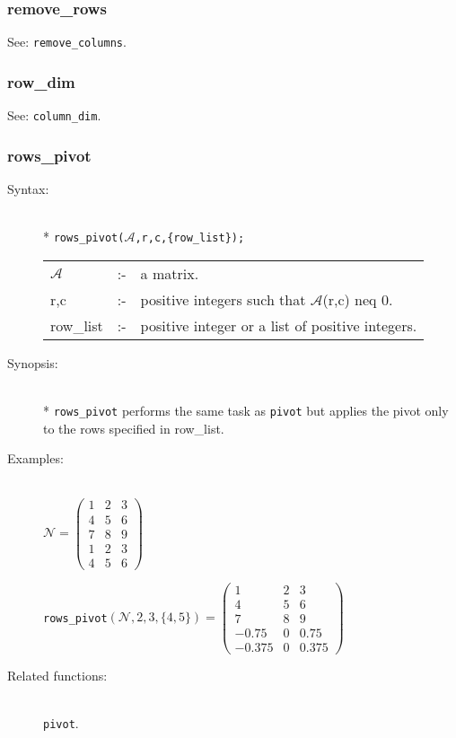 \subsubsection{remove\_rows}
\label{linalg:remove_rows}
See: \texttt{remove\_columns}.


\subsubsection{row\_dim}
\label{linalg:row_dim}

See: \texttt{column\_dim}.


\subsubsection{rows\_pivot}
\label{linalg:rows_pivot}

\begin{description}
\item[Syntax:]\mbox{}\\*
\texttt{rows\_pivot($\mathcal{A}$,r,c,\{row\_list\});}\\[2mm]
\begin{tabular}{l l l}
$\mathcal{A}$ &:-& a matrix. \\
r,c        &:-& positive integers such that $\mathcal{A}$(r,c) neq 0.\\
row\_list  &:-& positive integer or a list of positive integers.
\end{tabular}

\item[Synopsis:]\mbox{}\\*
\texttt{rows\_pivot} performs the same task as \texttt{pivot} but applies
the pivot only to the rows specified in row\_list.

\item[Examples:]\mbox{}\\
  \(\mathcal{N} = \begin{pmatrix} 1 & 2 & 3 \\ 4 & 5 & 6 \\ 7 & 8 &
    9 \\1 & 2 & 3 \\ 4 & 5 & 6 \end{pmatrix}\)

  \texttt{rows\_pivot}\((\mathcal{N},2,3,\{4,5\}) = \begin{pmatrix}
    1 & 2 & 3 \\ 4 & 5 & 6 \\ 7 & 8 & 9 \\ -0.75 & 0 & 0.75 \\
    -0.375 & 0 & 0.375
  \end{pmatrix}\)

\item[Related functions:]\mbox{}\\
\texttt{pivot}.
\end{description}



